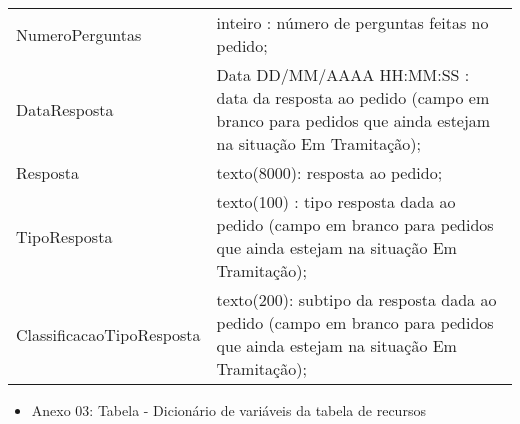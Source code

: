 \documentclass[]{article}
\newenvironment{Shaded}{\begin{snugshade}}{\end{snugshade}}
\newcommand{\KeywordTok}[1]{\textcolor[rgb]{0.13,0.29,0.53}{\textbf{#1}}}
\newcommand{\DataTypeTok}[1]{\textcolor[rgb]{0.13,0.29,0.53}{#1}}
\newcommand{\DecValTok}[1]{\textcolor[rgb]{0.00,0.00,0.81}{#1}}
\newcommand{\StringTok}[1]{\textcolor[rgb]{0.31,0.60,0.02}{#1}}
\newcommand{\CommentTok}[1]{\textcolor[rgb]{0.56,0.35,0.01}{\textit{#1}}}
\newcommand{\OperatorTok}[1]{\textcolor[rgb]{0.81,0.36,0.00}{\textbf{#1}}}
\newcommand{\NormalTok}[1]{#1}
\providecommand{\tightlist}{%
  \setlength{\itemsep}{0pt}\setlength{\parskip}{0pt}}
\begin{document}
\begin{landscape}
\begin{table}[!h]
\begin{tabular}[t]{l>{\raggedright\arraybackslash}p{15cm}}
NumeroPerguntas & inteiro : número de perguntas feitas no pedido;\\
DataResposta & Data DD/MM/AAAA HH:MM:SS : data da resposta ao pedido (campo em branco para pedidos que ainda estejam na situação Em Tramitação);\\
Resposta & texto(8000): resposta ao pedido;\\
TipoResposta & texto(100) : tipo resposta dada ao pedido (campo em branco para pedidos que ainda estejam na situação Em Tramitação);\\
ClassificacaoTipoResposta & texto(200): subtipo da resposta dada ao pedido (campo em branco para pedidos que ainda estejam na situação Em Tramitação);\\
\bottomrule
\end{tabular}
\end{table}
\end{landscape}

\begin{itemize}
\tightlist
\item
  Anexo 03: Tabela - Dicionário de variáveis da tabela de recursos
\end{itemize}

\begin{Shaded}
\end{Shaded}
\end{document}
